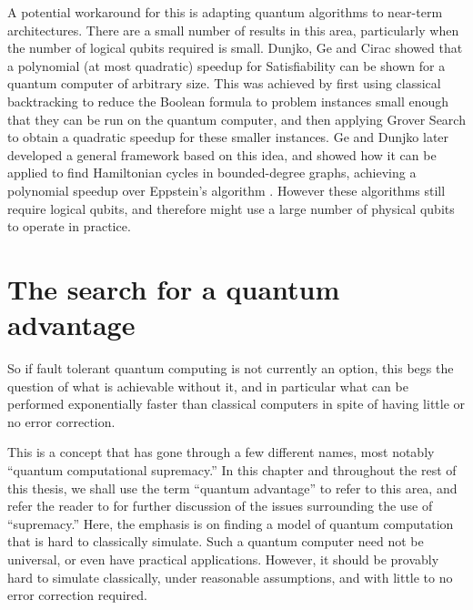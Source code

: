 A potential workaround for this is adapting quantum algorithms to near-term architectures. There are a small number of results in this area, particularly when the number of logical qubits required is small. Dunjko, Ge and Cirac \cite{dunjko2018} showed that a polynomial (at most quadratic) speedup for Satisfiability can be shown for a quantum computer of arbitrary size. This was achieved by first using classical backtracking to reduce the Boolean formula to problem instances small enough that they can be run on the quantum computer, and then applying Grover Search to obtain a quadratic speedup for these smaller instances. Ge and Dunjko \cite{ge2019} later developed a general framework based on this idea, and showed how it can be applied to find Hamiltonian cycles in bounded-degree graphs, achieving a polynomial speedup over Eppstein's algorithm \cite{eppstein2007}. However these algorithms still require logical qubits, and therefore might use a large number of physical qubits to operate in practice. 

\section{The search for a quantum advantage}
\label{sec:quantum-advantage}

So if fault tolerant quantum computing is not currently an option, this begs the question of what is achievable without it, and in particular what can be performed exponentially faster than classical computers in spite of having little or no error correction.

This is a concept that has gone through a few different names, most notably ``quantum computational supremacy.'' In this chapter and throughout the rest of this thesis, we shall use the term ``quantum advantage'' to refer to this area, and refer the reader to \cite{wiesner2017, palaciosberraquero2019} for further discussion of the issues surrounding the use of ``supremacy.'' Here, the emphasis is on finding a model of quantum computation that is hard to classically simulate. Such a quantum computer need not be universal, or even have practical applications. However, it should be provably hard to simulate classically, under reasonable assumptions, and with little to no error correction required.

